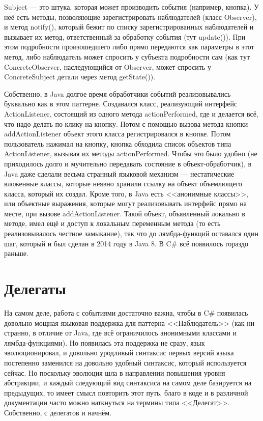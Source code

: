 \documentclass{../../text-style}
\begin{document}
Subject --- это штука, которая может производить события (например, кнопка). У неё есть методы, позволяющие зарегистрировать наблюдателей (класс Observer), и метод notify(), который бежит по списку зарегистрированных наблюдателей и вызывает их метод, ответственный за обработку события (тут update()). При этом подробности произошедшего либо прямо передаются как параметры в этот метод, либо наблюдатель может спросить у субъекта подробности сам (как тут ConcreteObserver, наследующийся от Observer, может спросить у ConcreteSubject детали через метод getState()).

Собственно, в Java долгое время обработчики событий реализовывались буквально как в этом паттерне. Создавался класс, реализующий интерфейс ActionListener, состоящий из одного метода actionPerformed, где и делается всё, что надо делать по клику на кнопку. Потом с помощью вызова метода кнопки addActionListener объект этого класса регистрировался в кнопке. Потом пользователь нажимал на кнопку, кнопка обходила список объектов типа ActionListener, вызывая их методы actionPerformed. Чтобы это было удобно (не приходилось долго и мучительно передавать состояние в объект-обработчик), в Java даже сделали весьма странный языковой механизм --- нестатические вложенные классы, которые неявно хранили ссылку на объект объемлющего класса, который их создал. Кроме того, в Java есть <<анонимные классы>>, или объектные выражения, которые могут реализовывать интерфейс прямо на месте, при вызове addActionListener. Такой объект, объявленный локально в методе, имел ещё и доступ к локальным переменным метода (то есть реализовывалось честное замыкание), так что до лямбда-функций оставался один шаг, который и был сделан в 2014 году в Java 8. В C\# всё появилось гораздо раньше.

\section{Делегаты}

На самом деле, работа с событиями достаточно важна, чтобы в C\# появилась довольно мощная языковая поддержка для паттерна <<Наблюдатель>> (как ни странно, в отличие от Java, где всё ограничилось анонимными классами и лямбда-функциями). Но появилась эта поддержка не сразу, язык эволюционировал, и довольно уродливый синтаксис первых версий языка постепенно заменился на довольно удобный синтаксис, который используется сейчас. Но поскольку эволюция шла в направлении повышения уровня абстракции, и каждый следующий вид синтаксиса на самом деле базируется на предыдущих, то имеет смысл повторить этот путь, благо в коде и в различной документации часто можно наткнуться на термины типа <<Делегат>>. Собственно, с делегатов и начнём.
\end{document}
